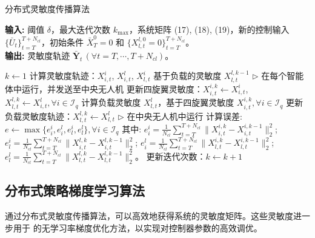\documentclass[lang=chs, degree=master, blindreview=false, winfonts=true]{yanputhesis}
\begin{document}
\begin{algorithm}[h]
    \caption{分布式灵敏度传播算法}
    \label{alg:sensitivity_propagation}
    \textbf{输入:} 阈值 $\delta$，最大迭代次数 $k_{\text{max}}$，系统矩阵 (17), (18), (19)，新的控制输入 $\{\bar{U}_t\}_{t=T}^{T+N_{cl}}$，初始条件 $\bar{X}_T^0 = 0$ 和 $\{X_{l,t}^{l,0} = 0\}_{t=T}^{T+N_{cl}}$。\\
    \textbf{输出:} 灵敏度轨迹 $\bar{\mathbf{Y}}_t \, (\forall t = T, \cdots, T+N_{cl})$。

    \begin{algorithmic}[1]
    \State $k \gets 1$
                \State 计算灵敏度轨迹：$X_{i,t}^i$, $X_{i,t}^l$, $X_{l,t}^i$
                \Statex \quad 基于负载的灵敏度 $X_{l,t}^{l,k-1}$
                \Statex \quad $\triangleright$ 在每个智能体中运行，并发送至中央无人机
            \EndFor
        \EndFor
        \State 更新四旋翼灵敏度：$X_{i,t}^{i,k} \gets X_{i,t}^i$, $X_{l,t}^{l,k} \gets X_{i,t}^l, \forall i \in \mathcal{I}_q$
            \State 计算负载灵敏度 $X_{l,t}^l$，基于四旋翼灵敏度 $X_{i,t}^{i,k}, \forall i \in \mathcal{I}_q$
        \EndFor
        \State 更新负载灵敏度轨迹：$X_{l,t}^{l,k} \gets X_{l,t}^l$
        \Statex \quad $\triangleright$ 在中央无人机中运行
        \State 计算误差: 
        \Statex \quad $e \gets \max \{ e_i^i, e_i^l, e_l^i, e_l^l \}, \forall i \in \mathcal{I}_q$
        \Statex \quad 其中:
        \Statex \quad $e_i^i = \frac{1}{N_{cl}} \sum_{t=T}^{T+N_{cl}} \| X_{i,t}^{i,k} - X_{i,t}^{i,k-1} \|_2^2$;
        \Statex \quad $e_l^i = \frac{1}{N_{cl}} \sum_{t=T}^{T+N_{cl}} \| X_{i,t}^{l,k} - X_{i,t}^{l,k-1} \|_2^2$;
        \Statex \quad $e_i^l = \frac{1}{N_{cl}} \sum_{t=T}^{T+N_{cl}} \| X_{l,t}^{i,k} - X_{l,t}^{i,k-1} \|_2^2$;
        \Statex \quad $e_l^l = \frac{1}{N_{cl}} \sum_{t=T}^{T+N_{cl}} \| X_{l,t}^{l,k} - X_{l,t}^{l,k-1} \|_2^2$。
        \State 更新迭代次数：$k \gets k + 1$
    \EndWhile
    \end{algorithmic}
\end{algorithm}

\subsection{分布式策略梯度学习算法}


通过分布式灵敏度传播算法，可以高效地获得系统的灵敏度矩阵。这些灵敏度进一步用于 \cite{cheng2023difftune} 的无学习率梯度优化方法，以实现对控制器参数的高效调优。
\end{document}
